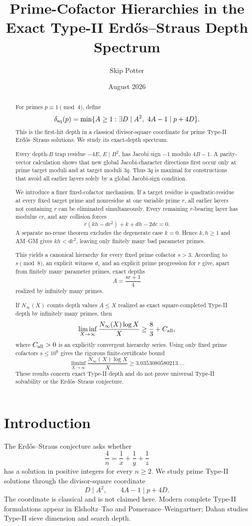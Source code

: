 \documentclass[11pt]{article}
\title{Prime-Cofactor Hierarchies in the Exact Type-II Erd\H{o}s--Straus Depth Spectrum}
\author{Skip Potter}
\date{August 2026}
\theoremstyle{definition}
\newcommand{\sqdepth}{\delta_{\rm sq}}
\begin{document}
\maketitle

\begin{abstract}
For primes $p\equiv1\pmod4$, define
\[
\sqdepth(p)=\min\{A\ge1:\exists D\mid A^2,\ 4A-1\mid p+4D\}.
\]
This is the first-hit depth in a classical divisor-square coordinate for prime Type-II Erd\H{o}s--Straus solutions. We study its exact-depth spectrum.

Every depth-$B$ trap residue $-4E$, $E\mid B^2$, has Jacobi sign $-1$ modulo $4B-1$. A parity-vector calculation shows that new global Jacobi-character directions first occur only at prime target moduli and at target moduli $3q$. Thus $3q$ is maximal for constructions that avoid all earlier layers solely by a global Jacobi-sign condition.

We introduce a finer fixed-cofactor mechanism. If a target residue is quadratic-residue at every fixed target prime and nonresidue at one variable prime $r$, all earlier layers not containing $r$ can be eliminated simultaneously. Every remaining $r$-bearing layer has modulus $cr$, and any collision forces
\[
\boxed{r(kh-dc^2)+k+dh-2dc=0.}
\]
A separate no-reuse theorem excludes the degenerate case $k=0$. Hence $k,h\ge1$ and AM--GM gives $kh<dc^2$, leaving only finitely many bad parameter primes.

This yields a canonical hierarchy for every fixed prime cofactor $s>3$. According to $s\pmod8$, an explicit witness $d_s$ and an explicit prime progression for $r$ give, apart from finitely many parameter primes, exact depths
\[
A=\frac{sr+1}{4}
\]
realized by infinitely many primes.

If $N_\infty(X)$ counts depth values $A\le X$ realized as exact square-completed Type-II depth by infinitely many primes, then
\[
\liminf_{X\to\infty}\frac{N_\infty(X)\log X}{X}\ge\frac83+C_{\rm all},
\]
where $C_{\rm all}>0$ is an explicitly convergent hierarchy series. Using only fixed prime cofactors $s\le10^6$ gives the rigorous finite-certificate bound
\[
\boxed{\liminf_{X\to\infty}\frac{N_\infty(X)\log X}{X}\ge3.0353080580213\ldots .}
\]
These results concern exact Type-II depth and do not prove universal Type-II solvability or the Erd\H{o}s--Straus conjecture.
\end{abstract}

\section{Introduction}
The Erd\H{o}s--Straus conjecture asks whether
\[
\frac4n=\frac1x+\frac1y+\frac1z
\]
has a solution in positive integers for every $n\ge2$. We study prime Type-II solutions through the divisor-square coordinate
\begin{equation}\label{eq:square}
D\mid A^2,\qquad 4A-1\mid p+4D.
\end{equation}
The coordinate is classical and is not claimed here. Modern complete Type-II formulations appear in Elsholtz--Tao and Pomerance--Weingartner; Dahan studies Type-II sieve dimension and search depth.
\end{document}
